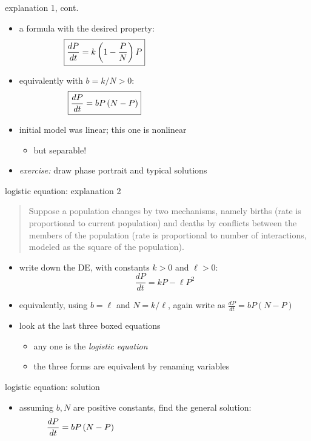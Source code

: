 \documentclass{beamer}
\begin{document}
\begin{frame}{explanation 1, cont.}

\begin{itemize}
\item a formula with the desired property:
    $$\boxed{\frac{dP}{dt} = k \left(1-\frac{P}{N}\right) P} \hspace{50mm}$$
\item equivalently with $b=k/N >0$:
    $$\boxed{\frac{dP}{dt} = b P \left(N-P\right)} \hspace{50mm}$$
\item initial model was linear; this one is nonlinear
     \begin{itemize}
     \item but separable!
     \end{itemize}
\item \emph{exercise:} draw phase portrait and typical solutions
\end{itemize}
\end{frame}


\begin{frame}{logistic equation: explanation 2}

\small
\begin{quotation}
\noindent Suppose a population changes by two mechanisms, namely births (rate is proportional to current population) and deaths by conflicts between the members of the population (rate is proportional to number of interactions, modeled as the square of the population).
\end{quotation}

\normalsize
\begin{itemize}
\item write down the DE, with constants $k>0$ and $\ell>0$:
    $$\boxed{\frac{dP}{dt} = k P - \ell P^2}$$
\item equivalently, using $b=\ell$ and $N=k/\ell$, again write as $\frac{dP}{dt} = b P \left(N-P\right)$
\item look at the last three boxed equations
    \begin{itemize}
    \item any one is the \emph{logistic equation}
    \item the three forms are equivalent by renaming variables
    \end{itemize}
\end{itemize}
\end{frame}


\begin{frame}{logistic equation: solution}

\begin{itemize}
\item assuming $b,N$ are positive constants, find the general solution:
    $$\frac{dP}{dt} = b P \left(N-P\right) \hspace{70mm}$$
\end{itemize}

\vspace{50mm}
\end{frame}
\end{document}
